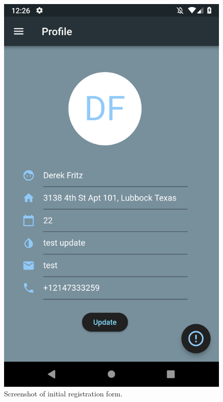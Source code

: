 \documentclass[10pt, a4paper]{article}
\begin{document}
\begin{figure}[H]
  \includegraphics[width=\linewidth]{final-diagrams/Emulator-Screenshots/Screenshot_1556126813.png}
  \caption{Screenshot of initial registration form.}
\endminipage
\end{figure}
\end{document}
